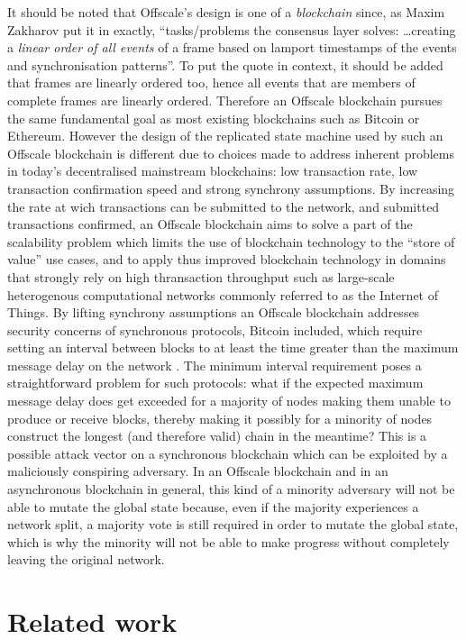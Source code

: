 \documentclass[a4paper,11pt]{article}
\begin{document}
It should be noted that Offscale's design is one of a \emph{blockchain} since, as Maxim Zakharov put
it in \cite{notes} exactly, ``tasks/problems the consensus layer solves: \dots creating a
\emph{linear order of all events} of a frame based on lamport timestamps of the events and
synchronisation patterns''. To put the quote in context, it should be added that frames are linearly
ordered too, hence all events that are members of complete frames are linearly ordered. Therefore an
Offscale blockchain pursues the same fundamental goal as most existing blockchains such as Bitcoin
or Ethereum. However the design of the replicated state machine used by such an Offscale blockchain
is different due to choices made to address inherent problems in today's decentralised mainstream
blockchains: low transaction rate, low transaction confirmation speed and strong synchrony
assumptions. By increasing the rate at wich transactions can be submitted to the network, and
submitted transactions confirmed, an Offscale blockchain aims to solve a part of the scalability
problem which limits the use of blockchain technology to the ``store of value'' use cases, and to
apply thus improved blockchain technology in domains that strongly rely on high thransaction
throughput such as large-scale heterogenous computational networks commonly referred to as the
Internet of Things. By lifting synchrony assumptions an Offscale blockchain addresses security
concerns of synchronous protocols, Bitcoin included, which require setting an interval between
blocks to at least the time greater than the maximum message delay on the network
\cite{rethinking}. The minimum interval requirement poses a straightforward problem for such
protocols: what if the expected maximum message delay does get exceeded for a majority of nodes
making them unable to produce or receive blocks, thereby making it possibly for a minority of nodes
construct the longest (and therefore valid) chain in the meantime? This is a possible attack vector
on a synchronous blockchain which can be exploited by a maliciously conspiring adversary. In an
Offscale blockchain and in an asynchronous blockchain in general, this kind of a minority adversary
will not be able to mutate the global state because, even if the majority experiences a network
split, a majority vote is still required in order to mutate the global state, which is why the
minority will not be able to make progress without completely leaving the original network.


\section{Related work}
\end{document}
